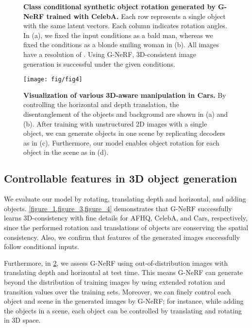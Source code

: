 \documentclass[nohyperref]{article}
\theoremstyle{plain}
\theoremstyle{definition}
\theoremstyle{remark}
\begin{document}
\begin{figure}[t]
\begin{center}
\vskip -0.15in
\caption{\textbf{Class conditional synthetic object rotation generated by G-NeRF trained with CelebA.} Each row represents a single object with the same latent vectors. Each column indicates rotation angles. In (a), we fixed the input conditions as a bald man, whereas we fixed the conditions as a blonde smiling woman in (b). All images have a resolution of . Using G-NeRF, 3D-consistent image generation is successful under the given conditions.}
\label{figure_3}
\end{center}
\vskip -0.2in
\end{figure}


\begin{figure}[t]
\begin{center}
\centerline{\texttt{[image: fig/fig4]}}
\vskip -0.1in
\caption{\textbf{Visualization of various 3D-aware manipulation in Cars.} By controlling the horizontal and depth translation, the disentanglement of the objects and background are shown in (a) and (b). After training with unstructured 2D images with a single object, we can generate  objects in one scene by replicating  decoders as in (c). Furthermore, our model enables  object rotation for each object in the scene as in (d).}
\label{figure_4}
\end{center}
\vskip -0.3in
\end{figure}





\subsection{Controllable features in 3D object generation}
We evaluate our model by rotating, translating depth and horizontal, and adding objects. \cref{figure_1,figure_3,figure_4} demonstrates that G-NeRF successfully learns 3D-consistency with fine details for AFHQ, CelebA, and Cars, respectively, since the performed rotation and translations of objects are conserving the spatial consistency. Also, we confirm that features of the generated images successfully follow conditional inputs.

Furthermore, in \cref{figure_4}, we assess G-NeRF using out-of-distribution images with translating depth and horizontal at test time. This means G-NeRF can generate beyond the distribution of training images by using extended rotation and transition values over the training sets. Moreover, we can finely control each object and scene in the generated images by G-NeRF; for instance, while adding the objects in a scene, each object can be controlled by translating and rotating in 3D space.
\end{document}
